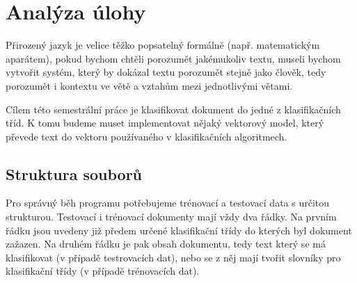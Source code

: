 \documentclass[
12pt,
a4paper,
pdftex,
czech,
titlepage
]{report}
\begin{document}
\chapter{Analýza úlohy}
Přirozený jazyk je velice těžko popsatelný formálně (např. matematickým aparátem), pokud bychom chtěli porozumět jakémukoliv textu, museli bychom vytvořit systém, který by dokázal textu porozumět stejně jako člověk, tedy porozumět i kontextu ve větě a vztahům mezi jednotlivými větami.

Cílem této semestrální práce je klasifikovat dokument do jedné z klasifikačních tříd. K tomu budeme muset implementovat nějaký vektorový model, který převede text do vektoru používaného v klasifikačních algoritmech.
\section{Struktura souborů}
Pro správný běh programu potřebujeme trénovací a testovací data s určitou strukturou. Testovací i trénovací dokumenty mají vždy dva řádky. Na prvním řádku jsou uvedeny již předem určené klasifikační třídy do kterých byl dokument zažazen. Na druhém řádku je pak obsah dokumentu, tedy text který se má klasifikovat (v případě testrovacích dat), nebo se z něj mají tvořit slovníky pro klasifikační třídy (v případě trénovacích dat).
\end{document}
